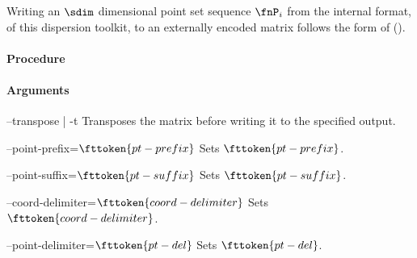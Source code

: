 %
Writing an $\sdim$ dimensional point set sequence $\fnP_i$ from the internal format, of this dispersion toolkit, to an externally encoded matrix follows the form of (). 

\paragraph{Procedure}

\begin{synopsis}
\end{synopsis}

\paragraph{Arguments}

\procarginseq{\ptseqsize}

\procargout

\begin{procarg}{--transpose | -t}
  Transposes the matrix before writing it to the specified output.
\end{procarg}

\begin{procarg}{--point-prefix=$\fttoken{pt-prefix}$}
  Sets $\fttoken{pt-prefix}$.
\end{procarg}

\begin{procarg}{--point-suffix=$\fttoken{pt-suffix}$}
  Sets $\fttoken{pt-suffix}$.
\end{procarg}

\begin{procarg}{--coord-delimiter=$\fttoken{coord-delimiter}$}
  Sets $\fttoken{coord-delimiter}$.
\end{procarg}

\begin{procarg}{--point-delimiter=$\fttoken{pt-del}$}
  Sets $\fttoken{pt-del}$.
\end{procarg}

